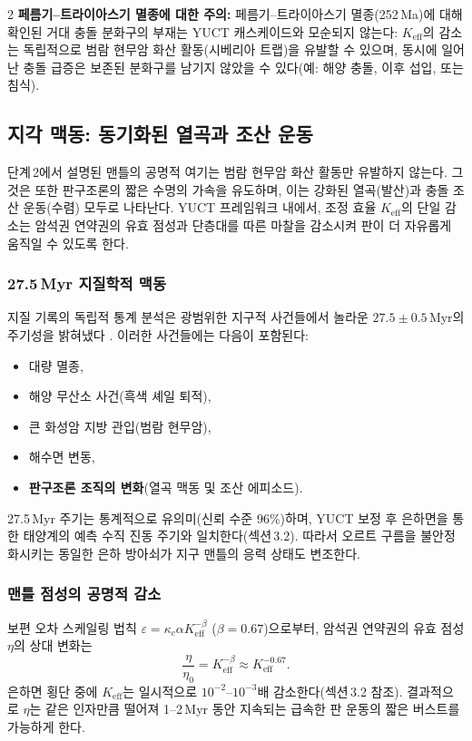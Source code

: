 \documentclass[12pt,a4paper]{article}
\begin{document}
\begin{multicols}{2}
		\noindent
		\textbf{페름기–트라이아스기 멸종에 대한 주의:} 페름기–트라이아스기 멸종(252 Ma)에 대해 확인된 거대 충돌 분화구의 부재는 YUCT 캐스케이드와 모순되지 않는다: \(K_{\mathrm{eff}}\)의 감소는 독립적으로 범람 현무암 화산 활동(시베리아 트랩)을 유발할 수 있으며, 동시에 일어난 충돌 급증은 보존된 분화구를 남기지 않았을 수 있다(예: 해양 충돌, 이후 섭입, 또는 침식).
		
		\subsection{지각 맥동: 동기화된 열곡과 조산 운동}
		단계 2에서 설명된 맨틀의 공명적 여기는 범람 현무암 화산 활동만 유발하지 않는다. 그것은 또한 판구조론의 짧은 수명의 가속을 유도하며, 이는 강화된 열곡(발산)과 충돌 조산 운동(수렴) 모두로 나타난다. YUCT 프레임워크 내에서, 조정 효율 \(K_{\mathrm{eff}}\)의 단일 감소는 암석권 연약권의 유효 점성과 단층대를 따른 마찰을 감소시켜 판이 더 자유롭게 움직일 수 있도록 한다.
		
		\subsubsection{27.5 Myr 지질학적 맥동}
		지질 기록의 독립적 통계 분석은 광범위한 지구적 사건들에서 놀라운 \(27.5 \pm 0.5\) Myr의 주기성을 밝혀냈다 \cite{Rampino2021,Rampino2023}. 이러한 사건들에는 다음이 포함된다:
		\begin{itemize}
			\item 대량 멸종,
			\item 해양 무산소 사건(흑색 셰일 퇴적),
			\item 큰 화성암 지방 관입(범람 현무암),
			\item 해수면 변동,
			\item \textbf{판구조론 조직의 변화}(열곡 맥동 및 조산 에피소드).
		\end{itemize}
		27.5 Myr 주기는 통계적으로 유의미(신뢰 수준 96\%)하며, YUCT 보정 후 은하면을 통한 태양계의 예측 수직 진동 주기와 일치한다(섹션 3.2). 따라서 오르트 구름을 불안정화시키는 동일한 은하 방아쇠가 지구 맨틀의 응력 상태도 변조한다.
		
		\subsubsection{맨틀 점성의 공명적 감소}
		보편 오차 스케일링 법칙 \(\varepsilon = \kappa_c \alpha K_{\mathrm{eff}}^{-\beta}\) (\(\beta=0.67\))으로부터, 암석권 연약권의 유효 점성 \(\eta\)의 상대 변화는
		\[
		\frac{\eta}{\eta_0} = K_{\mathrm{eff}}^{-\beta} \approx K_{\mathrm{eff}}^{-0.67}.
		\]
		은하면 횡단 중에 \(K_{\mathrm{eff}}\)는 일시적으로 \(10^{-2}\)–\(10^{-3}\)배 감소한다(섹션 3.2 참조). 결과적으로 \(\eta\)는 같은 인자만큼 떨어져 1–2 Myr 동안 지속되는 급속한 판 운동의 짧은 버스트를 가능하게 한다.
		

\end{multicols}
\end{document}
